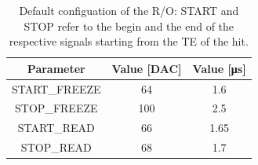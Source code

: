         \begin{table}
            \begin{center}
            \begin{tabular}{|c | c | c |}
            \hline
            Parameter & Value [\si{DAC}] & Value [\si{\us}]\\
            \hline
            \hline
            START\_FREEZE & 64 & 1.6\\
            STOP\_FREEZE & 100 & 2.5\\
            START\_READ & 66 & 1.65\\
            STOP\_READ & 68 & 1.7\\
            \hline
            \end{tabular}
            \caption{Default configuation of the R/O: START and STOP refer to the begin and the end of the respective signals starting from the TE of the hit.}
            \label{tab:R/O_param}
            \end{center}
        \end{table}

